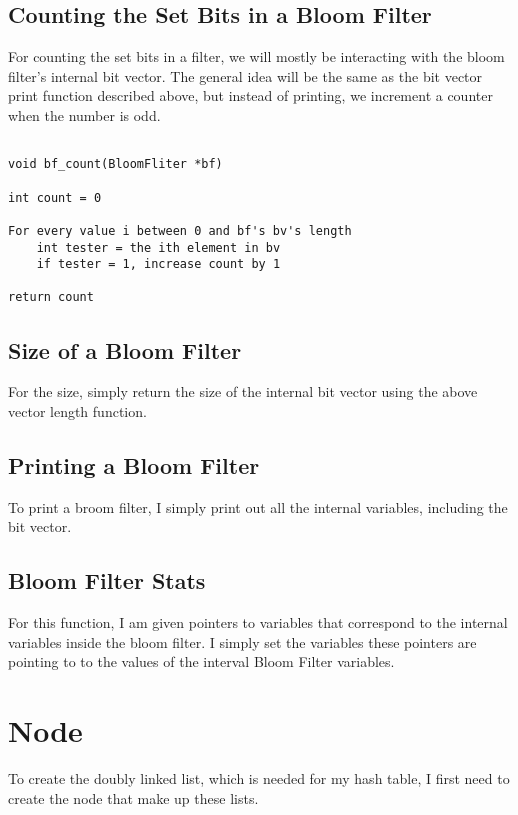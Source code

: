 \documentclass[11pt]{article}
\begin{document}
\subsection{Counting the Set Bits in a Bloom Filter}

For counting the set bits in a filter, we will mostly be interacting with the bloom filter's internal bit vector. The general idea will be the same as the bit vector print function described above, but instead of printing, we increment a counter when the number is odd.

\begin{verbatim}

void bf_count(BloomFliter *bf)

int count = 0

For every value i between 0 and bf's bv's length
    int tester = the ith element in bv
    if tester = 1, increase count by 1

return count

\end{verbatim}

\subsection{Size of a Bloom Filter}

For the size, simply return the size of the internal bit vector using the above vector length function.

\subsection{Printing a Bloom Filter}

To print a broom filter, I simply print out all the internal variables, including the bit vector.

\subsection{Bloom Filter Stats}

For this function, I am given pointers to variables that correspond to the internal variables inside the bloom filter. I simply set the variables these pointers are pointing to to the values of the interval Bloom Filter variables.

\section{Node}

To create the doubly linked list, which is needed for my hash table, I first need to create the node that make up these lists.
\end{document}
